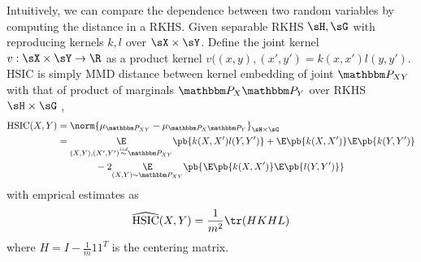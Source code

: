 \documentclass[11pt]{article}
\begin{document}
Intuitively, we can compare the dependence between two random variables by computing the distance in a RKHS. Given separable RKHS $\sH,\sG$ with reproducing kernels $k,l$ over $\sX \times \sY$. Define the joint kernel $v:\sX\times\sY\to\R$ as a product kernel $v((x,y),(x',y') = k(x,x')l(y,y')$. HSIC is simply MMD distance between kernel embedding of joint $\bbP_{XY}$ with that of product of marginals $\bbP_X\bbP_Y$ over RKHS $\sH\times\sG$ \cite{grettonKernelMethodsMeasuring2005},
\begin{align}
    \text{HSIC}(X,Y)
        &= \norm{\mu_{\bbP_{XY}} - \mu_{\bbP_X \bbP_Y}}_{\sH\times\sG} \\ 
        &= \underset{(X,Y),(X',Y')\overset{iid}{\sim}\bbP_{XY}}{\E} \pb{ k(X,X')l(Y,Y') }
         + \E\pb{k(X,X')}\E\pb{k(Y,Y')} \\ 
        &\quad\quad\quad\quad -2 \underset{(X,Y)\sim \bbP_{XY}}{\E} \pb{ \E\pb{k(X,X')} \E\pb{l(Y,Y')} }
\end{align} 
with emprical estimates as 
\begin{align}
    \widehat{\text{HSIC}}(X,Y)
        = \frac{1}{m^2} \tr(HKHL)
\end{align}
where $H = I-\frac{1}{m} 11^T$ is the centering matrix.

 


\newpage
\printbibliography 
\end{document}
